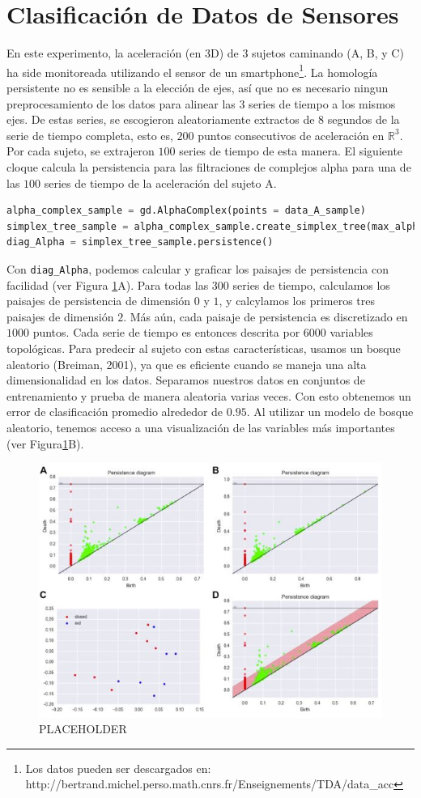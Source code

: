 \section{Clasificaci\'on de Datos de Sensores}
En este experimento, la aceleraci\'on (en $3$D) de $3$ sujetos caminando
(A, B, y C) ha side monitoreada utilizando el sensor de un
smartphone\footnote{Los datos pueden ser descargados en:
http://bertrand.michel.perso.math.cnrs.fr/Enseignements/TDA/data\_acc}.
La homolog\'ia persistente no es sensible a la elecci\'on de ejes,
así que no es necesario ningun preprocesamiento de los datos para alinear
las $3$ series de tiempo a los mismos ejes.
De estas series, se escogieron aleatoriamente extractos de
$8$ segundos de la serie de tiempo completa, esto es,
$200$ puntos consecutivos de aceleraci\'on en $\mathbb{R}^{3}$.
Por cada sujeto, se extrajeron $100$ series de tiempo de esta manera.
El siguiente cloque calcula la persistencia para las filtraciones de complejos alpha para
una de las $100$ series de tiempo de la aceleraci\'on del sujeto A.

\begin{lstlisting}[language=Python]
alpha_complex_sample = gd.AlphaComplex(points = data_A_sample)
simplex_tree_sample = alpha_complex_sample.create_simplex_tree(max_alpha_square = 0.3)
diag_Alpha = simplex_tree_sample.persistence()
\end{lstlisting}

Con \verb|diag_Alpha|, podemos calcular y graficar
los paisajes de persistencia con facilidad (ver Figura \ref{fig:Figura 15}A).
Para todas las $300$ series de tiempo, calculamos los paisajes de persistencia de
dimensi\'on $0$ y $1$, y calcylamos los primeros tres paisajes de dimensi\'on $2$.
M\'as a\'un, cada paisaje de persistencia es discretizado en $1000$ puntos.
Cada serie de tiempo es entonces descrita por $6000$ variables topol\'ogicas.
Para predecir al sujeto con estas caracter\'isticas, usamos un bosque aleatorio
(Breiman, 2001\cite{Breiman2001}), ya que es eficiente cuando se maneja una
alta dimensionalidad en los datos.
Separamos nuestros datos en conjuntos de entrenamiento y prueba de manera
aleatoria varias veces.
Con esto obtenemos un error de clasificaci\'on promedio alrededor de $0.95$.
Al utilizar un modelo de bosque aleatorio, tenemos acceso a una visualizaci\'on
de las variables m\'as importantes (ver Figura\ref{fig:Figura 15}B).

\begin{figure}[ht]
    \centering
    \includegraphics[width=0.85\linewidth]{./figures/Figura14.JPG}
    \caption{
        PLACEHOLDER
    }
    \label{fig:Figura 15}
    \vspace{15pt}
\end{figure}